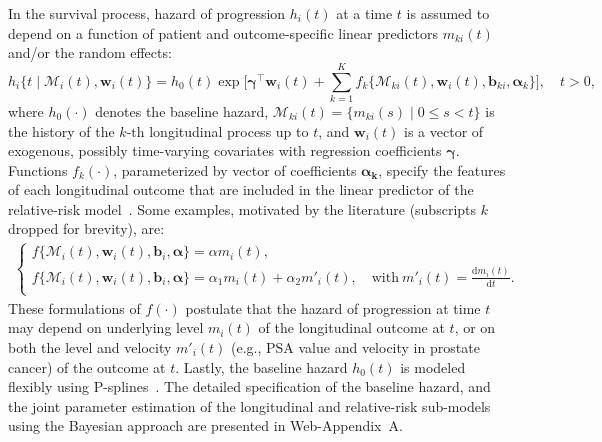 In the survival process, hazard of progression $h_i(t)$ at a time $t$ is assumed to depend on a function of patient and outcome-specific linear predictors $m_{ki}(t)$ and/or the random effects:
\begin{equation*}
\label{eq:rel_risk_model}
h_i\big\{t \mid \mathcal{M}_i(t), \boldsymbol{w}_i(t)\big\} = h_0(t) \exp\Big[\boldsymbol{\gamma}^{\top}\boldsymbol{w}_i(t) + \sum_{k=1}^{K} f_{k} \big\{ \mathcal{M}_{ki}(t), \boldsymbol{w}_i(t), \boldsymbol{b}_{ki}, \boldsymbol{\alpha}_{k} \big\}\Big], \quad t>0,
\end{equation*}
where $h_0(\cdot)$ denotes the baseline hazard, $\mathcal{M}_{ki}(t)=\{m_{ki}(s) \mid 0 \leq s < t \}$ is the history of the ${k\mbox{-th}}$ longitudinal process up to $t$, and $\boldsymbol{w}_i(t)$ is a vector of exogenous, possibly time-varying covariates with regression coefficients $\boldsymbol{\gamma}$. Functions $f_{k}(\cdot)$, parameterized by vector of coefficients $\boldsymbol{\alpha_{k}}$, specify the features of each longitudinal outcome that are included in the linear predictor of the relative-risk model~\citep{brown2009assessing,rizopoulos2012joint,taylor2013real}. Some examples, motivated by the literature (subscripts $k$ dropped for brevity), are:
\begin{eqnarray*}
\left \{
\begin{array}{l}
f\big\{\mathcal{M}_{i}(t), \boldsymbol{w}_i(t), \boldsymbol{b}_{i}, \boldsymbol{\alpha} \big\} = \alpha m_{i}(t),\\
f\big\{ \mathcal{M}_{i}(t), \boldsymbol{w}_i(t), \boldsymbol{b}_{i}, \boldsymbol{\alpha}\big\} = \alpha_1 m_{i}(t) + \alpha_2 m'_{i}(t),\quad \text{with}\  m'_{i}(t) = \frac{\mathrm{d}{m_{i}(t)}}{\mathrm{d}{t}}.\\
\end{array}
\right.
\end{eqnarray*}
These formulations of $f(\cdot)$ postulate that the hazard of progression at time $t$ may depend on underlying level $m_i(t)$ of the longitudinal outcome at $t$, or on both the level and velocity $m'_i(t)$ (e.g., PSA value and velocity in prostate cancer) of the outcome at $t$. Lastly, the baseline hazard $h_0(t)$ is modeled flexibly using P-splines~\citep{eilers1996flexible}. The detailed specification of the baseline hazard, and the joint parameter estimation of the longitudinal and relative-risk sub-models using the Bayesian approach are presented in Web-Appendix~A.